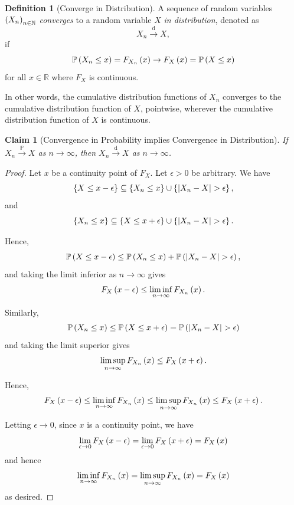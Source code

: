 \documentclass{article}
\newtheorem{claim}[theorem]{Claim}
\theoremstyle{definition}
\newtheorem{definition}[theorem]{Definition}
\theoremstyle{remark}
\DeclarePairedDelimiter{\abs}{\lvert}{\rvert}
\newcommand{\RR}{\mathbb{R}}
\newcommand{\NN}{\mathbb{N}}
\newcommand{\Prob}{\mathbb{P}}
\newcommand{\toDist}{\xrightarrow{\mathrm{d}}}
\newcommand{\toProb}{\xrightarrow{\mathbb P}}
\begin{document}
\begin{definition}[Converge in Distribution]
    \label{def:convergence-in-distribution}%
    A sequence of random variables \(\pqty{X_n}_{n \in \NN}\) \emph{converges} to a random variable \(X\) \emph{in distribution}, denoted as
    \[
        X_n \toDist X,
    \]
    if
    \[
        \Prob\pqty{X_n \leq x} = F_{X_n} \pqty{x} \to F_X \pqty{x} = \Prob\pqty{X \leq x}
    \]
    for all \(x \in \RR\) where \(F_X\) is continuous.
    
    In other words, the cumulative distribution functions of \(X_n\) converges to the cumulative distribution function of \(X\), pointwise, wherever the cumulative distribution function of \(X\) is continuous.
\end{definition}

\begin{claim}[Convergence in Probability implies Convergence in Distribution]
    \label{claim:convergence-in-probability-implies-converges-in-distribution}%
    If \(X_n \toProb X\) as \(n \to \infty\), then \(X_n \toDist X\) as \(n \to \infty\).
\end{claim}

\begin{proof}
    Let \(x\) be a continuity point of \(F_X\). Let \(\epsilon > 0\) be arbitrary. We have
    \[
        \Bqty{X \leq x - \epsilon} \subseteq \Bqty{X_n \leq x} \cup \Bqty{\abs{X_n - X} > \epsilon},
    \]
    and
    \[
        \Bqty{X_n \leq x} \subseteq \Bqty{X \leq x + \epsilon} \cup \Bqty{\abs{X_n - X} > \epsilon}.
    \]

    Hence,
    \[
        \Prob\pqty{X \leq x - \epsilon} \leq \Prob\pqty{X_n \leq x} + \Prob\pqty{\abs{X_n - X} > \epsilon},
    \]
    and taking the limit inferior as \(n \to \infty\) gives
    \[
        F_X \left(x - \epsilon\right) \leq \liminf_{n \to \infty} F_{X_n} \left(x\right).
    \]

    Similarly,
    \[
        \Prob\pqty{X_n \leq x} \leq \Prob\pqty{X \leq x + \epsilon} = \Prob\pqty{\abs{X_n - X} > \epsilon}
    \]
    and taking the limit superior gives
    \[
        \limsup_{n \to \infty} F_{X_n} \left(x\right) \leq F_X \left(x + \epsilon\right).
    \]

    Hence,
    \[
        F_{X} \left(x - \epsilon\right) \leq \liminf_{n \to \infty} F_{X_n} \left(x\right) \leq \limsup_{n \to \infty} F_{X_n} \left(x\right) \leq F_X \left(x + \epsilon\right).
    \]

    Letting \(\epsilon \to 0\), since \(x\) is a continuity point, we have
    \[
        \lim_{\epsilon \to 0} F_X\left(x - \epsilon\right) = \lim_{\epsilon \to 0} F_X\left(x + \epsilon\right) = F_X\left(x\right)
    \]
    and hence
    \[
        \liminf_{n \to \infty} F_{X_n} \left(x\right) = \limsup_{n \to \infty} F_{X_n} \left(x\right) = F_X \left(x\right)
    \]
    as desired.
\end{proof}
\end{document}
